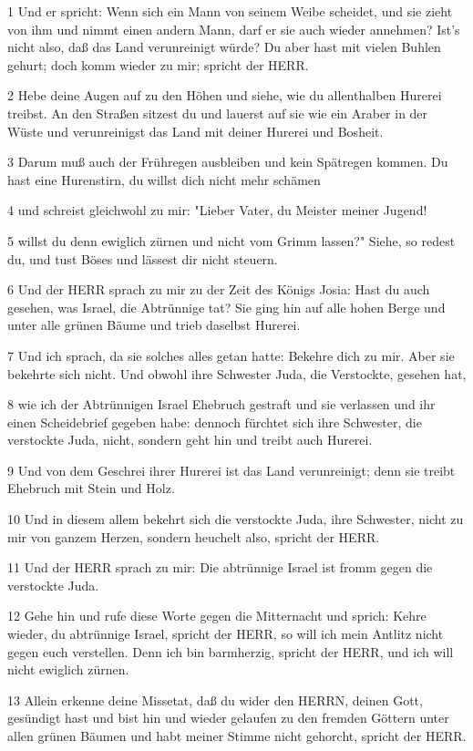 \par 1 Und er spricht: Wenn sich ein Mann von seinem Weibe scheidet, und sie zieht von ihm und nimmt einen andern Mann, darf er sie auch wieder annehmen? Ist's nicht also, daß das Land verunreinigt würde? Du aber hast mit vielen Buhlen gehurt; doch komm wieder zu mir; spricht der HERR.
\par 2 Hebe deine Augen auf zu den Höhen und siehe, wie du allenthalben Hurerei treibst. An den Straßen sitzest du und lauerst auf sie wie ein Araber in der Wüste und verunreinigst das Land mit deiner Hurerei und Bosheit.
\par 3 Darum muß auch der Frühregen ausbleiben und kein Spätregen kommen. Du hast eine Hurenstirn, du willst dich nicht mehr schämen
\par 4 und schreist gleichwohl zu mir: "Lieber Vater, du Meister meiner Jugend!
\par 5 willst du denn ewiglich zürnen und nicht vom Grimm lassen?" Siehe, so redest du, und tust Böses und lässest dir nicht steuern.
\par 6 Und der HERR sprach zu mir zu der Zeit des Königs Josia: Hast du auch gesehen, was Israel, die Abtrünnige tat? Sie ging hin auf alle hohen Berge und unter alle grünen Bäume und trieb daselbst Hurerei.
\par 7 Und ich sprach, da sie solches alles getan hatte: Bekehre dich zu mir. Aber sie bekehrte sich nicht. Und obwohl ihre Schwester Juda, die Verstockte, gesehen hat,
\par 8 wie ich der Abtrünnigen Israel Ehebruch gestraft und sie verlassen und ihr einen Scheidebrief gegeben habe: dennoch fürchtet sich ihre Schwester, die verstockte Juda, nicht, sondern geht hin und treibt auch Hurerei.
\par 9 Und von dem Geschrei ihrer Hurerei ist das Land verunreinigt; denn sie treibt Ehebruch mit Stein und Holz.
\par 10 Und in diesem allem bekehrt sich die verstockte Juda, ihre Schwester, nicht zu mir von ganzem Herzen, sondern heuchelt also, spricht der HERR.
\par 11 Und der HERR sprach zu mir: Die abtrünnige Israel ist fromm gegen die verstockte Juda.
\par 12 Gehe hin und rufe diese Worte gegen die Mitternacht und sprich: Kehre wieder, du abtrünnige Israel, spricht der HERR, so will ich mein Antlitz nicht gegen euch verstellen. Denn ich bin barmherzig, spricht der HERR, und ich will nicht ewiglich zürnen.
\par 13 Allein erkenne deine Missetat, daß du wider den HERRN, deinen Gott, gesündigt hast und bist hin und wieder gelaufen zu den fremden Göttern unter allen grünen Bäumen und habt meiner Stimme nicht gehorcht, spricht der HERR.
